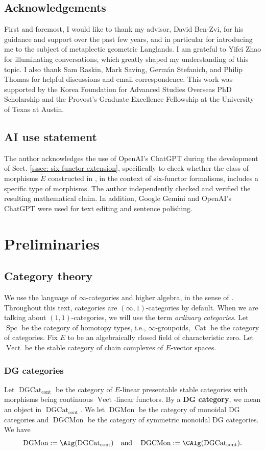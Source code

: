 \documentclass[10pt]{amsart}
\newcommand{\sssec}{\subsubsection}
\theoremstyle{remark}
\newcommand{\te}{\text}
\newcommand{\on}{\operatorname}
\newcommand{\Cat}{\on{Cat}}
\newcommand{\DGcat}{\on{DGCat}_{\on{cont}}}
\newcommand{\DGCatMon}{\on{DGMon}}
\newcommand{\DGCatSymMon}{\on{DGCMon}}
\newcommand{\Vect}{\on{Vect}}
\newcommand{\Spc}{\on{Spc}}
\begin{document}
\subsection{Acknowledgements}
First and foremost, I would like to thank my advisor, David Ben-Zvi, for his guidance and support over the past few years, and in particular for introducing me to the subject of metaplectic geometric Langlands. I am grateful to Yifei Zhao for illuminating conversations, which greatly shaped my understanding of this topic. I also thank Sam Raskin, Mark Saving, Germ\'an Stefanich, and Philip Thomas for helpful discussions and email correspondence. This work was supported by the Korea Foundation for Advanced Studies Overseas PhD Scholarship and the Provost’s Graduate Excellence Fellowship at the University of Texas at Austin.

\subsection{AI use statement}
The author acknowledges the use of OpenAI's ChatGPT during the development of Sect. \ref{sssec: six functor extension}, specifically to check whether the class of morphisms $\widetilde{E}$ constructed in \cite[Theorem 5.19]{Sch}, in the context of six-functor formalisms, includes a specific type of morphisms. The author independently checked and verified the resulting mathematical claim. In addition, Google Gemini and OpenAI's ChatGPT were used for text editing and sentence polishing.

\section{Preliminaries}
\subsection{Category theory}
We use the language of $\infty$-categories and higher algebra, in the sense of \cite{HTT, HA}. Throughout this text, categories are $(\infty,1)$-categories by default. When we are talking about $(1,1)$-categories, we will use the term \emph{ordinary categories}. 
Let $\Spc$ be the category of homotopy types, i.e., $\infty$-groupoids, $\Cat$ be the category of categories. Fix $E$ to be an algebraically closed field of characteristic zero. Let $\Vect$ be the stable category of chain complexes of $E$-vector spaces.

\sssec{DG categories}
Let $\DGcat$ be the category of $E$-linear presentable stable categories with morphisms being continuous $\Vect$-linear functors. By a \textbf{DG category}, we mean an object in $\DGcat$. We let $\DGCatMon$ be the category of monoidal DG categories and $\DGCatSymMon$ be the category of symmetric monoidal DG categories. We have
\[\DGCatMon:=\Alg(\DGcat)\quad\te{and}\quad \DGCatSymMon:=\CAlg(\DGcat).\]
\end{document}
